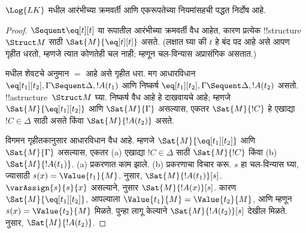 \documentclass[../../../include/open-logic-section]{subfiles}
\begin{document}


\begin{prop}
$\Log{LK}$ मधील आरंभीच्या क्रमवर्ती आणि एकरूपतेच्या नियमांसहची पद्धत निर्दोष आहे.
\end{prop}

\begin{proof}
${} \Sequent \eq[t][t]$ या रूपातील आरंभीच्या क्रमवर्ती वैध आहेत, कारण
प्रत्येक !!{structure}~$\Struct M$ साठी $\Sat{M}{\eq[t][t]}$ असते. (लक्षात घ्या की
$t$ हे बंद पद आहे असे आपण गृहीत धरतो, म्हणजे त्यात कोणतेही चल नाही;
म्हणून चल-विन्यास अप्रासंगिक असतात.)

मधील शेवटचे अनुमान $=$ आहे असे गृहीत धरा. मग आधारविधान
$\eq[t_1][t_2], \Gamma \Sequent \Delta, !A(t_1)$ आणि निष्कर्ष
$\eq[t_1][t_2], \Gamma \Sequent \Delta, !A(t_2)$ असतो. !!a{structure}~$\Struct M$
घ्या. निष्कर्ष वैध आहे हे दाखवायचे आहे; म्हणजे $\Sat{M}{\eq[t_1][t_2]}$ आणि
$\Sat{M}{\Gamma}$ असल्यास, एकतर $\Sat{M}{!C}$ हे एखाद्या $!C \in \Delta$ साठी
असते किंवा $\Sat{M}{!A(t_2)}$ असते.

विगमन गृहीतकानुसार आधारविधान वैध आहे. म्हणजे $\Sat{M}{\eq[t_1][t_2]}$ आणि
$\Sat{M}{\Gamma}$ असल्यास, एकतर (a) एखाद्या $!C \in \Delta$ साठी
$\Sat{M}{!C}$ किंवा (b) $\Sat{M}{!A(t_1)}$. (a) प्रकरणात काम झाले.
(b) प्रकरणाचा विचार करू. $s$ हा चल-विन्यास घ्या, ज्यासाठी
$s(x) = \Value{t_1}{M}$.  नुसार,
$\Sat{M}{!A(t_1)}[s]$. $\varAssign{s}{s}{x}$ असल्याने,
 नुसार $\Sat{M}{!A(x)}[s]$. कारण
$\Sat{M}{\eq[t_1][t_2]}$, आपल्याला $\Value{t_1}{M} = \Value{t_2}{M}$,
आणि म्हणून $s(x) = \Value{t_2}{M}$ मिळते. 
पुन्हा लागू केल्याने $\Sat{M}{!A(t_2)}[s]$ देखील मिळते.
 नुसार,
$\Sat{M}{!A(t_2)}$.
\end{proof}
\end{document}
